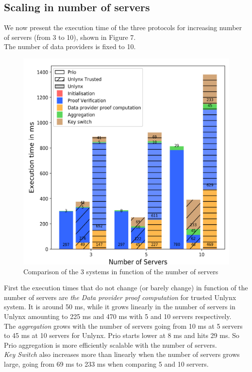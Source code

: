 \documentclass{article}
\begin{document}
\subsection{Scaling in number of servers}
We now present the execution time of the three protocols for increasing number of servers (from 3 to 10), shown in Figure 7.\\
The number of data providers is fixed to 10.
\begin{figure}[H]
\centering
\includegraphics[scale=0.15]{img/ComparisonlinearServer.png}
\caption{Comparison of the 3 systems in function of the number of servers}
\end{figure}
First the execution times that do not change (or barely change) in function of the number of servers  are \textit{the Data provider proof computation} for trusted Unlynx system. It is around 50 ms, while it grows linearly in the number of servers in Unlynx amounting to 225 ms and 470 ms with 5 and 10 servers respectively.\\
The \textit{aggregation} grows with the number of servers going from 10 ms at 5 servers to 45 ms at 10 servers for Unlynx. Prio starts lower at 8 ms and hits 29 ms. So Prio aggregation is more efficiently scalable with the number of servers.\\
\textit{Key Switch} also increases more than linearly when the number of servers grows large, going from 69 ms to 233 ms when comparing 5 and 10 servers.\\
\end{document}
